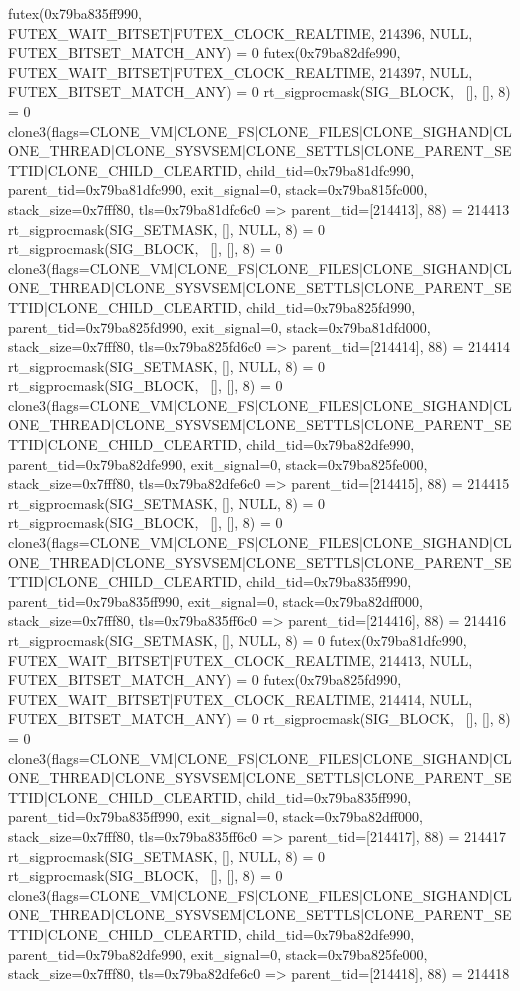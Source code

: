 \begin{breakableverbatim}
futex(0x79ba835ff990, FUTEX_WAIT_BITSET|FUTEX_CLOCK_REALTIME, 214396, NULL, FUTEX_BITSET_MATCH_ANY) = 0
futex(0x79ba82dfe990, FUTEX_WAIT_BITSET|FUTEX_CLOCK_REALTIME, 214397, NULL, FUTEX_BITSET_MATCH_ANY) = 0
rt_sigprocmask(SIG_BLOCK, ~[], [], 8)   = 0
clone3({flags=CLONE_VM|CLONE_FS|CLONE_FILES|CLONE_SIGHAND|CLONE_THREAD|CLONE_SYSVSEM|CLONE_SETTLS|CLONE_PARENT_SETTID|CLONE_CHILD_CLEARTID, child_tid=0x79ba81dfc990, parent_tid=0x79ba81dfc990, exit_signal=0, stack=0x79ba815fc000, stack_size=0x7fff80, tls=0x79ba81dfc6c0} => {parent_tid=[214413]}, 88) = 214413
rt_sigprocmask(SIG_SETMASK, [], NULL, 8) = 0
rt_sigprocmask(SIG_BLOCK, ~[], [], 8)   = 0
clone3({flags=CLONE_VM|CLONE_FS|CLONE_FILES|CLONE_SIGHAND|CLONE_THREAD|CLONE_SYSVSEM|CLONE_SETTLS|CLONE_PARENT_SETTID|CLONE_CHILD_CLEARTID, child_tid=0x79ba825fd990, parent_tid=0x79ba825fd990, exit_signal=0, stack=0x79ba81dfd000, stack_size=0x7fff80, tls=0x79ba825fd6c0} => {parent_tid=[214414]}, 88) = 214414
rt_sigprocmask(SIG_SETMASK, [], NULL, 8) = 0
rt_sigprocmask(SIG_BLOCK, ~[], [], 8)   = 0
clone3({flags=CLONE_VM|CLONE_FS|CLONE_FILES|CLONE_SIGHAND|CLONE_THREAD|CLONE_SYSVSEM|CLONE_SETTLS|CLONE_PARENT_SETTID|CLONE_CHILD_CLEARTID, child_tid=0x79ba82dfe990, parent_tid=0x79ba82dfe990, exit_signal=0, stack=0x79ba825fe000, stack_size=0x7fff80, tls=0x79ba82dfe6c0} => {parent_tid=[214415]}, 88) = 214415
rt_sigprocmask(SIG_SETMASK, [], NULL, 8) = 0
rt_sigprocmask(SIG_BLOCK, ~[], [], 8)   = 0
clone3({flags=CLONE_VM|CLONE_FS|CLONE_FILES|CLONE_SIGHAND|CLONE_THREAD|CLONE_SYSVSEM|CLONE_SETTLS|CLONE_PARENT_SETTID|CLONE_CHILD_CLEARTID, child_tid=0x79ba835ff990, parent_tid=0x79ba835ff990, exit_signal=0, stack=0x79ba82dff000, stack_size=0x7fff80, tls=0x79ba835ff6c0} => {parent_tid=[214416]}, 88) = 214416
rt_sigprocmask(SIG_SETMASK, [], NULL, 8) = 0
futex(0x79ba81dfc990, FUTEX_WAIT_BITSET|FUTEX_CLOCK_REALTIME, 214413, NULL, FUTEX_BITSET_MATCH_ANY) = 0
futex(0x79ba825fd990, FUTEX_WAIT_BITSET|FUTEX_CLOCK_REALTIME, 214414, NULL, FUTEX_BITSET_MATCH_ANY) = 0
rt_sigprocmask(SIG_BLOCK, ~[], [], 8)   = 0
clone3({flags=CLONE_VM|CLONE_FS|CLONE_FILES|CLONE_SIGHAND|CLONE_THREAD|CLONE_SYSVSEM|CLONE_SETTLS|CLONE_PARENT_SETTID|CLONE_CHILD_CLEARTID, child_tid=0x79ba835ff990, parent_tid=0x79ba835ff990, exit_signal=0, stack=0x79ba82dff000, stack_size=0x7fff80, tls=0x79ba835ff6c0} => {parent_tid=[214417]}, 88) = 214417
rt_sigprocmask(SIG_SETMASK, [], NULL, 8) = 0
rt_sigprocmask(SIG_BLOCK, ~[], [], 8)   = 0
clone3({flags=CLONE_VM|CLONE_FS|CLONE_FILES|CLONE_SIGHAND|CLONE_THREAD|CLONE_SYSVSEM|CLONE_SETTLS|CLONE_PARENT_SETTID|CLONE_CHILD_CLEARTID, child_tid=0x79ba82dfe990, parent_tid=0x79ba82dfe990, exit_signal=0, stack=0x79ba825fe000, stack_size=0x7fff80, tls=0x79ba82dfe6c0} => {parent_tid=[214418]}, 88) = 214418

\end{breakableverbatim}
